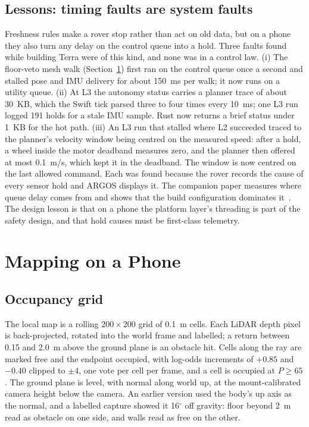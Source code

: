 \documentclass[conference]{IEEEtran}
\begin{document}
\subsection{Lessons: timing faults are system faults}
Freshness rules make a rover stop rather than act on old data, but on a phone they also turn any delay on the control queue into a hold.
Three faults found while building Terra were of this kind, and none was in a control law.
(i) The floor-veto mesh walk (Section~\ref{sec:map}) first ran on the control queue once a second and stalled pose and IMU delivery for about 150~ms per walk; it now runs on a utility queue.
(ii) At L3 the autonomy status carries a planner trace of about 30~KB, which the Swift tick parsed three to four times every 10~ms; one L3 run logged 191 holds for a stale IMU sample. Rust now returns a brief status under 1~KB for the hot path.
(iii) An L3 run that stalled where L2 succeeded traced to the planner's velocity window being centred on the measured speed: after a hold, a wheel inside the motor deadband measures zero, and the planner then offered at most 0.1~m/s, which kept it in the deadband. The window is now centred on the last allowed command.
Each was found because the rover records the cause of every sensor hold and ARGOS displays it.
The companion paper measures where queue delay comes from and shows that the build configuration dominates it~\cite{companion2026phone}.
The design lesson is that on a phone the platform layer's threading is part of the safety design, and that hold causes must be first-class telemetry.

\section{Mapping on a Phone}
\label{sec:map}

\subsection{Occupancy grid}
The local map is a rolling $200 \times 200$ grid of 0.1~m cells.
Each LiDAR depth pixel is back-projected, rotated into the world frame and labelled; a return between 0.15 and 2.0~m above the ground plane is an obstacle hit.
Cells along the ray are marked free and the endpoint occupied, with log-odds increments of $+0.85$ and $-0.40$ clipped to $\pm 4$, one vote per cell per frame, and a cell is occupied at $P \ge 65$.
The ground plane is level, with normal along world up, at the mount-calibrated camera height below the camera.
An earlier version used the body's up axis as the normal, and a labelled capture showed it 16$^\circ$ off gravity: floor beyond 2~m read as obstacle on one side, and walls read as free on the other.
\end{document}
